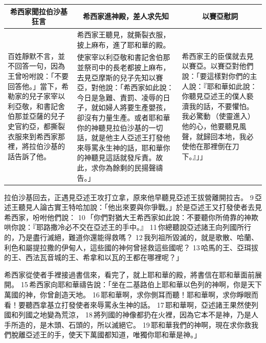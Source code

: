 \begin{table}[H]
\hspace{-8mm}
\centering
\begin{tabular}{p{3.9cm}|p{8.75cm}|p{4.5cm}}\hline\hline
\multicolumn{1}{c|}{希西家聞拉伯沙基狂言}&\multicolumn{1}{c|}{希西家進神殿，差人求先知}&\multicolumn{1}{c}{以賽亞慰詞}\\\hline
\multirow{4}{4.1cm}{百姓靜默不言，並不回答一句，因為王曾吩咐說：「不要回答他。」當下，希勒家的兒子家宰以利亞敬，和書記舍伯那並亞薩的兒子史官約亞，都撕裂衣服來到希西家那裡，將拉伯沙基的話告訴了他。}
&希西家王聽見，就撕裂衣服，披上麻布，進了耶和華的殿。 &\multirow{4}{4.67cm}{希西家王的臣僕就去見以賽亞。以賽亞對他們說：「要這樣對你們的主人說：『耶和華如此說：你聽見亞述王的僕人褻瀆我的話，不要懼怕。我必驚動 （使靈進入）他的心，他要聽見風聲，就歸回本地，我必使他在那裡倒在刀下。』」」}\\\cline{2-2}

&使家宰以利亞敬和書記舍伯那並祭司中的長老都披上麻布，去見亞摩斯的兒子先知以賽亞，對他說：「希西家如此說：今日是急難、責罰、凌辱的日子，就如婦人將要生產嬰孩，卻沒有力量生產。或者耶和華你的神聽見拉伯沙基的一切話，就是他主人亞述王打發他來辱罵永生神的話，耶和華你的神聽見這話就發斥責。故此，求你為餘剩的民揚聲禱告。」&\\\hline
\end{tabular}
\end{table}



拉伯沙基回去，正遇見亞述王攻打立拿，原來他早聽見亞述王拔營離開拉吉。 9 亞述王聽見人論古實王特哈加說：「他出來要與你爭戰。」於是亞述王又打發使者去見希西家，吩咐他們說： 10 「你們對猶大王希西家如此說：不要聽你所倚靠的神欺哄你說：『耶路撒冷必不交在亞述王的手中。』 11 你總聽說亞述諸王向列國所行的，乃是盡行滅絕，難道你還能得救嗎？ 12 我列祖所毀滅的，就是歌散、哈蘭、利色和屬提拉撒的伊甸人，這些國的神何曾拯救這些國呢？ 13 哈馬的王、亞珥拔的王、西法瓦音城的王、希拿和以瓦的王都在哪裡呢？」

希西家從使者手裡接過書信來，看完了，就上耶和華的殿，將書信在耶和華面前展開。 15 希西家向耶和華禱告說：「坐在二基路伯上耶和華以色列的神啊，你是天下萬國的神，你曾創造天地。 16 耶和華啊，求你側耳而聽！耶和華啊，求你睜眼而看！要聽西拿基立打發使者來辱罵永生神的話。 17 耶和華啊，亞述諸王果然使列國和列國之地變為荒涼， 18 將列國的神像都扔在火裡，因為它本不是神，乃是人手所造的，是木頭、石頭的，所以滅絕它。 19 耶和華我們的神啊，現在求你救我們脫離亞述王的手，使天下萬國都知道，唯獨你耶和華是神。」


